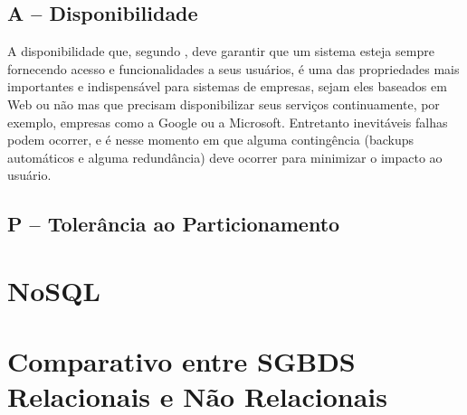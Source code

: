 \subsection{ A – Disponibilidade }
A disponibilidade que, segundo \cite{BROWNE}, deve garantir que um sistema esteja sempre fornecendo acesso e funcionalidades a seus usuários, 
é uma das propriedades mais importantes e indispensável para sistemas de empresas, sejam eles baseados em Web ou não mas  que precisam disponibilizar
seus serviços continuamente, por exemplo, empresas como a Google ou a Microsoft. Entretanto inevitáveis falhas podem ocorrer, e é nesse momento em que 
alguma contingência (backups automáticos e alguma redundância) deve ocorrer para minimizar o impacto ao usuário.

\subsection{ P – Tolerância ao Particionamento }

\section{NoSQL}

\section{Comparativo entre SGBDS Relacionais e Não Relacionais}
